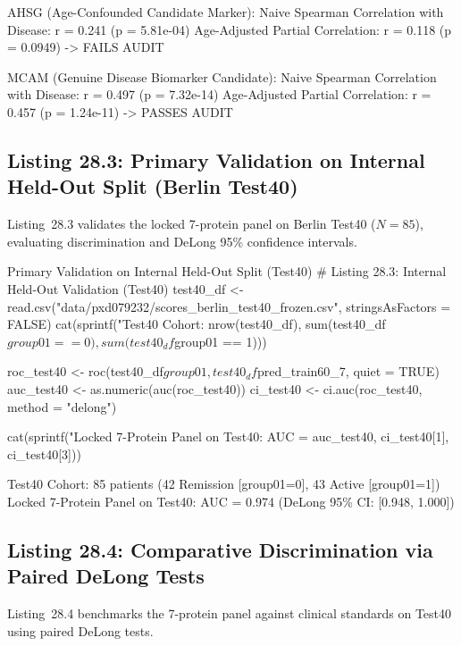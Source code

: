 \documentclass[11pt,twoside,openright]{book}
\begin{document}
\begin{routput}
AHSG (Age-Confounded Candidate Marker):
  Naive Spearman Correlation with Disease: r = 0.241 (p = 5.81e-04)
  Age-Adjusted Partial Correlation:        r = 0.118 (p = 0.0949) -> FAILS AUDIT

MCAM (Genuine Disease Biomarker Candidate):
  Naive Spearman Correlation with Disease: r = 0.497 (p = 7.32e-14)
  Age-Adjusted Partial Correlation:        r = 0.457 (p = 1.24e-11) -> PASSES AUDIT
\end{routput}

\subsection{Listing 28.3: Primary Validation on Internal Held-Out Split (Berlin Test40)}

Listing~28.3 validates the locked 7-protein panel on Berlin Test40 ($N = 85$), evaluating discrimination and DeLong 95\% confidence intervals.

\begin{rchunk}{Primary Validation on Internal Held-Out Split (Test40)}
# Listing 28.3: Internal Held-Out Validation (Test40)
test40_df <- read.csv("data/pxd079232/scores_berlin_test40_frozen.csv", stringsAsFactors = FALSE)
cat(sprintf("Test40 Cohort: %
            nrow(test40_df), sum(test40_df$group01 == 0), sum(test40_df$group01 == 1)))

roc_test40 <- roc(test40_df$group01, test40_df$pred_train60_7, quiet = TRUE)
auc_test40 <- as.numeric(auc(roc_test40))
ci_test40  <- ci.auc(roc_test40, method = "delong")

cat(sprintf("Locked 7-Protein Panel on Test40: AUC = %
            auc_test40, ci_test40[1], ci_test40[3]))
\end{rchunk}

\begin{routput}
Test40 Cohort: 85 patients (42 Remission [group01=0], 43 Active [group01=1])
Locked 7-Protein Panel on Test40: AUC = 0.974 (DeLong 95\% CI: [0.948, 1.000])
\end{routput}

\subsection{Listing 28.4: Comparative Discrimination via Paired DeLong Tests}

Listing~28.4 benchmarks the 7-protein panel against clinical standards on Test40 using paired DeLong tests.
\end{document}
